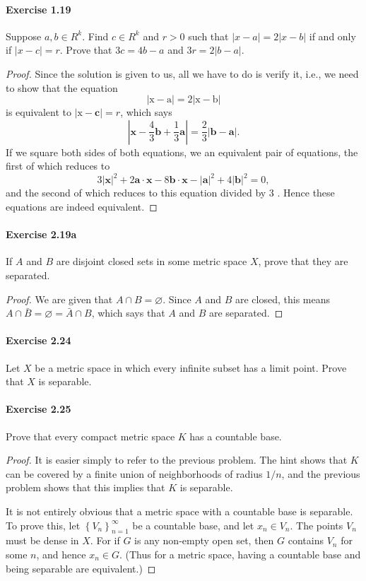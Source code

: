 \documentclass{article}
\theoremstyle{definition}
\begin{document}
\paragraph{Exercise 1.19} Suppose $a, b \in R^k$. Find $c \in R^k$ and $r > 0$ such that $|x-a|=2|x-b|$ if and only if $| x - c | = r$. Prove that $3c = 4b - a$ and $3r = 2 |b - a|$.
\begin{proof}
    Since the solution is given to us, all we have to do is verify it, i.e., we need to show that the equation
$$
|\mathrm{x}-\mathrm{a}|=2|\mathrm{x}-\mathrm{b}|
$$
is equivalent to $|\mathrm{x}-\mathbf{c}|=r$, which says
$$
\left|\mathbf{x}-\frac{4}{3} \mathbf{b}+\frac{1}{3} \mathbf{a}\right|=\frac{2}{3}|\mathbf{b}-\mathbf{a}| .
$$
If we square both sides of both equations, we an equivalent pair of equations, the first of which reduces to
$$
3|\mathbf{x}|^2+2 \mathbf{a} \cdot \mathbf{x}-8 \mathbf{b} \cdot \mathbf{x}-|\mathbf{a}|^2+4|\mathbf{b}|^2=0,
$$
and the second of which reduces to this equation divided by 3 . Hence these equations are indeed equivalent.
\end{proof}



\paragraph{Exercise 2.19a} If $A$ and $B$ are disjoint closed sets in some metric space $X$, prove that they are separated.
\begin{proof}
    We are given that $A \cap B=\varnothing$. Since $A$ and $B$ are closed, this means $A \cap \bar{B}=\varnothing=\bar{A} \cap B$, which says that $A$ and $B$ are separated.
\end{proof}



\paragraph{Exercise 2.24} Let $X$ be a metric space in which every infinite subset has a limit point. Prove that $X$ is separable.


\paragraph{Exercise 2.25} Prove that every compact metric space $K$ has a countable base.
\begin{proof}
    It is easier simply to refer to the previous problem. The hint shows that $K$ can be covered by a finite union of neighborhoods of radius $1 / n$, and the previous problem shows that this implies that $K$ is separable.

It is not entirely obvious that a metric space with a countable base is separable. To prove this, let $\left\{V_n\right\}_{n=1}^{\infty}$ be a countable base, and let $x_n \in V_n$. The points $V_n$ must be dense in $X$. For if $G$ is any non-empty open set, then $G$ contains $V_n$ for some $n$, and hence $x_n \in G$. (Thus for a metric space, having a countable base and being separable are equivalent.)
\end{proof}
\end{document}
